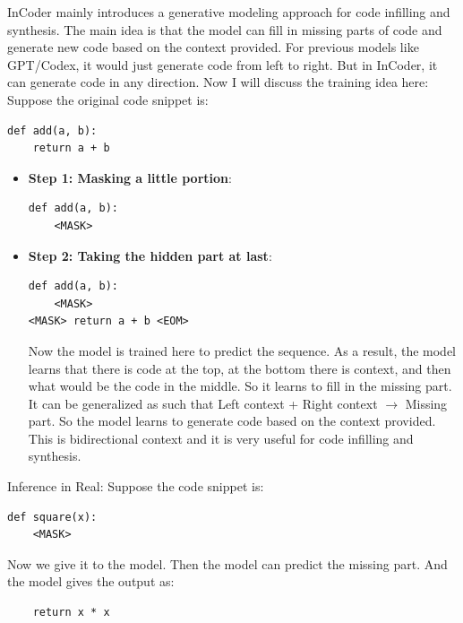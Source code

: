 \documentclass[12pt]{article}
\begin{document}
InCoder mainly introduces a generative modeling approach for code infilling and synthesis. The main idea is that the model can fill in missing parts of code and generate new code based on the context provided. For previous models like GPT/Codex, it would just generate code from left to right. But in InCoder, it can generate code in any direction. Now I will discuss the training idea here:
Suppose the original code snippet is:
	\begin{lstlisting}
def add(a, b):
	return a + b
\end{lstlisting}
\begin{itemize}
	\item \textbf{Step 1: Masking a little portion}:
	\begin{lstlisting}
def add(a, b):
	<MASK>
	\end{lstlisting}
	\item \textbf{Step 2: Taking the hidden part at last}:
	\begin{lstlisting}
def add(a, b):
	<MASK>
<MASK> return a + b <EOM>
	\end{lstlisting}
	Now the model is trained here to predict the sequence. As a result, the model learns that there is code at the top, at the bottom there is context, and then what would be the code in the middle. So it learns to fill in the missing part. It can be generalized as such that Left context + Right context $\rightarrow$ Missing part. So the model learns to generate code based on the context provided. This is bidirectional context and it is very useful for code infilling and synthesis. 
	
\end{itemize} 
Inference in Real:
Suppose the code snippet is:
\begin{lstlisting}
def square(x):
	<MASK>
\end{lstlisting}
Now we give it to the model. Then the model can predict the missing part. And the model gives the output as:
\begin{lstlisting}
	return x * x
\end{lstlisting}
\end{document}
